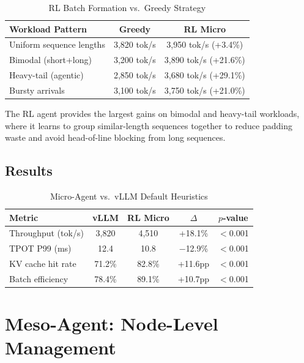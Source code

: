 \documentclass[conference,10pt]{IEEEtran}
\begin{document}
\begin{table}[!htbp]
\caption{RL Batch Formation vs.\ Greedy Strategy}
\label{tab:batch}
\centering\scriptsize
\begin{tabular}{@{}lcc@{}}
\toprule
\textbf{Workload Pattern} & \textbf{Greedy} & \textbf{RL Micro} \\
\midrule
Uniform sequence lengths & 3,820 tok/s & 3,950 tok/s (+3.4\%) \\
Bimodal (short+long) & 3,200 tok/s & 3,890 tok/s (+21.6\%) \\
Heavy-tail (agentic) & 2,850 tok/s & 3,680 tok/s (+29.1\%) \\
Bursty arrivals & 3,100 tok/s & 3,750 tok/s (+21.0\%) \\
\bottomrule
\end{tabular}
\end{table}

The RL agent provides the largest gains on bimodal and heavy-tail workloads, where it learns to group similar-length sequences together to reduce padding waste and avoid head-of-line blocking from long sequences.

\subsection{Results}

\begin{table}[!htbp]
\caption{Micro-Agent vs.\ vLLM Default Heuristics}
\label{tab:micro}
\centering\scriptsize
\begin{tabular}{@{}lcccc@{}}
\toprule
\textbf{Metric} & \textbf{vLLM} & \textbf{RL Micro} & \textbf{$\Delta$} & \textbf{$p$-value} \\
\midrule
Throughput (tok/s) & 3,820 & 4,510 & +18.1\% & $<$0.001 \\
TPOT P99 (ms) & 12.4 & 10.8 & $-$12.9\% & $<$0.001 \\
KV cache hit rate & 71.2\% & 82.8\% & +11.6pp & $<$0.001 \\
Batch efficiency & 78.4\% & 89.1\% & +10.7pp & $<$0.001 \\
\bottomrule
\end{tabular}
\end{table}

\section{Meso-Agent: Node-Level Management}
\label{sec:meso}
\end{document}
